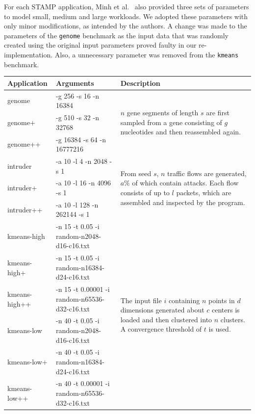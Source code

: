 For each STAMP application, Minh et al.~\cite{minh2008stamp} also provided three sets of parameters to model small, medium and large workloads.
We adopted these parameters with only minor modifications, as intended by the authors.
A change was made to the parameters of the \texttt{genome} benchmark as the input data that was randomly created using the original input parameters proved faulty in our re-implementation.
Also, a unnecessary parameter was removed from the \texttt{kmeans} benchmark.

\begin{table}
    \centering
    \tiny
    \begin{tabular}{|l l l|}
        \hline
        \textbf{Application} & \textbf{Arguments} & \textbf{Description}\\\hline\hline
        genome & -g 256 -s 16 -n 16384 & \multirow{3}{*}{\begin{minipage}{.4\textwidth}$n$ gene segments of length $s$ are first sampled from a gene consisting of $g$ nucleotides and then reassembled again.\end{minipage}}\\
        genome+ & -g 510 -s 32 -n 32768 & \\
        genome++ & -g 16384 -s 64 -n 16777216 & \\\hline

        intruder & -a 10 -l 4 -n 2048 -s 1 & \multirow{3}{*}{\begin{minipage}{.4\textwidth}From seed $s$, $n$ traffic flows are generated, $a\%$ of which contain attacks. Each flow consists of up to $l$ packets, which are assembled and inspected by the program.\end{minipage}}\\
        intruder+ & -a 10 -l 16 -n 4096 -s 1 & \\
        intruder++ & -a 10 -l 128 -n 262144 -s 1 & \\\hline

        kmeans-high & -n 15 -t 0.05 -i random-n2048-d16-c16.txt & \multirow{6}{*}{\begin{minipage}{.4\textwidth}The input file $i$ containing $n$ points in $d$ dimensions generated about $c$ centers is loaded and then clustered into $n$ clusters. A convergence threshold of $t$ is used.\end{minipage}}\\
        kmeans-high+ & -n 15 -t 0.05 -i random-n16384-d24-c16.txt & \\
        kmeans-high++ & -n 15 -t 0.00001 -i random-n65536-d32-c16.txt & \\
        kmeans-low & -n 40 -t 0.05 -i random-n2048-d16-c16.txt & \\
        kmeans-low+ & -n 40 -t 0.05 -i random-n16384-d24-c16.txt & \\
        kmeans-low++ & -n 40 -t 0.00001 -i random-n65536-d32-c16.txt & \\\hline


\end{tabular}
\end{table}
